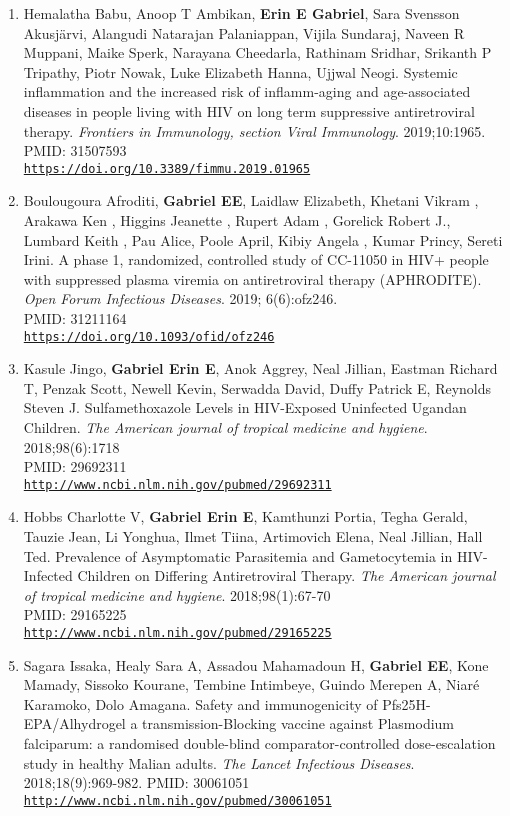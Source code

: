 \documentclass[12pt]{article}
\providecommand \url[1]{\href{#1}{#1}}
\renewcommand*\url[1]{\href{#1}{\texttt{#1}}}
\begin{document}
\begin{enumerate}
\item  Hemalatha Babu, Anoop T Ambikan, \textbf{Erin E Gabriel}, Sara Svensson Akusj\"arvi, Alangudi Natarajan Palaniappan, Vijila Sundaraj, Naveen R Muppani, Maike Sperk, Narayana Cheedarla, Rathinam Sridhar, Srikanth P Tripathy, Piotr Nowak, Luke Elizabeth Hanna, Ujjwal Neogi. Systemic inflammation and the increased risk of inflamm-aging and age-associated diseases in people living with HIV on long term suppressive antiretroviral therapy. \emph{Frontiers in Immunology, section Viral Immunology}. 2019;10:1965.\\
PMID: 31507593\\
\url{https://doi.org/10.3389/fimmu.2019.01965}

\item Boulougoura Afroditi, \textbf{Gabriel EE}, Laidlaw Elizabeth, Khetani Vikram , Arakawa Ken , Higgins Jeanette , Rupert Adam ,  Gorelick Robert J., Lumbard Keith ,  Pau Alice, Poole April, Kibiy Angela , Kumar Princy, Sereti Irini. A phase 1, randomized, controlled study of CC-11050 in HIV+ people with suppressed plasma viremia on antiretroviral therapy (APHRODITE). \emph{Open Forum Infectious Diseases}. 2019; 6(6):ofz246.\\
PMID: 31211164  \\
\url{https://doi.org/10.1093/ofid/ofz246}


\item Kasule Jingo, \textbf{Gabriel Erin E}, Anok Aggrey, Neal Jillian, Eastman Richard T, Penzak Scott, Newell Kevin, Serwadda David, Duffy Patrick E, Reynolds Steven J. Sulfamethoxazole Levels in HIV-Exposed Uninfected Ugandan Children. \emph{The American journal of tropical medicine and hygiene}. 2018;98(6):1718\\
PMID: 29692311 \\
\url{http://www.ncbi.nlm.nih.gov/pubmed/29692311}

\item Hobbs Charlotte V, \textbf{Gabriel Erin E}, Kamthunzi Portia, Tegha Gerald, Tauzie Jean, Li Yonghua, Ilmet Tiina, Artimovich Elena, Neal Jillian, Hall Ted. Prevalence of Asymptomatic Parasitemia and Gametocytemia in HIV-Infected Children on Differing Antiretroviral Therapy.  \emph{The American journal of tropical medicine and hygiene}. 2018;98(1):67-70\\
PMID: 29165225 \\
\url{http://www.ncbi.nlm.nih.gov/pubmed/29165225}



\item Sagara Issaka, Healy Sara A, Assadou Mahamadoun H, \textbf{Gabriel EE}, Kone Mamady, Sissoko Kourane, Tembine Intimbeye, Guindo Merepen A, Niaré Karamoko, Dolo Amagana. Safety and immunogenicity of Pfs25H-EPA/Alhydrogel{\textregistered} a transmission-Blocking vaccine against Plasmodium falciparum: a randomised double-blind comparator-controlled dose-escalation study in healthy Malian adults. \emph{The Lancet Infectious Diseases}. 2018;18(9):969-982.
PMID: 30061051\\
\url{http://www.ncbi.nlm.nih.gov/pubmed/30061051}


\end{enumerate}
\end{document}
